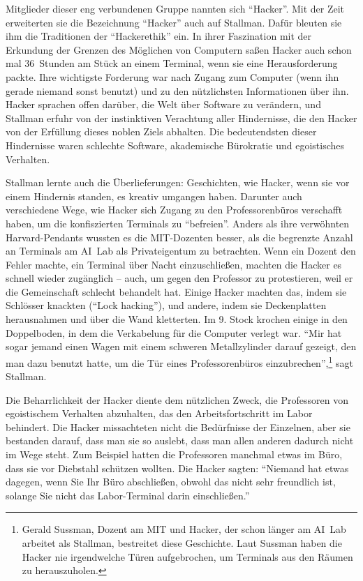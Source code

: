 Mitglieder dieser eng verbundenen Gruppe nannten sich "`Hacker"'. Mit der Zeit erweiterten sie die Bezeichnung "`Hacker"' auch auf Stallman. Dafür bleuten sie ihm die Traditionen der "`Hackerethik"' ein. In ihrer Faszination mit der Erkundung der Grenzen des Möglichen von Computern saßen Hacker auch schon mal 36~Stunden am Stück an einem Terminal, wenn sie eine Herausforderung packte. Ihre wichtigste Forderung war nach Zugang zum Computer (wenn ihn gerade niemand sonst benutzt) und zu den nützlichsten Informationen über ihn. Hacker sprachen offen darüber, die Welt über Software zu verändern, und Stallman erfuhr von der instinktiven Verachtung aller Hindernisse, die den Hacker von der Erfüllung dieses noblen Ziels abhalten. Die bedeutendsten dieser Hindernisse waren schlechte Software, akademische Bürokratie und egoistisches Verhalten.

Stallman lernte auch die Überlieferungen: Geschichten, wie Hacker, wenn sie vor einem Hindernis standen, es kreativ umgangen haben. Darunter auch verschiedene Wege, wie Hacker sich Zugang zu den Professorenbüros verschafft haben, um die konfiszierten Terminals zu "`befreien"'. Anders als ihre verwöhnten Harvard-Pendants wussten es die MIT-Dozenten besser, als die begrenzte Anzahl an Terminals am AI~Lab als Privateigentum zu betrachten. Wenn ein Dozent den Fehler machte, ein Terminal über Nacht einzuschließen, machten die Hacker es schnell wieder zugänglich – auch, um gegen den Professor zu protestieren, weil er die Gemeinschaft schlecht behandelt hat. Einige Hacker machten das, indem sie Schlösser knackten ("`Lock hacking"'), und andere, indem sie Deckenplatten herausnahmen und über die Wand kletterten. Im 9. Stock krochen einige in den Doppelboden, in dem die Verkabelung für die Computer verlegt war. "`Mir hat sogar jemand einen Wagen mit einem schweren Metallzylinder darauf gezeigt, den man dazu benutzt hatte, um die Tür eines Professorenbüros einzubrechen"',\footnote{Gerald Sussman, Dozent am MIT und Hacker, der schon länger am AI~Lab arbeitet als Stallman, bestreitet diese Geschichte. Laut Sussman haben die Hacker nie irgendwelche Türen aufgebrochen, um Terminals aus den Räumen zu herauszuholen.} sagt Stallman.

Die Beharrlichkeit der Hacker diente dem nützlichen Zweck, die Professoren von egoistischem Verhalten abzuhalten, das den Arbeitsfortschritt im Labor behindert. Die Hacker missachteten nicht die Bedürfnisse der Einzelnen, aber sie bestanden darauf, dass man sie so auslebt, dass man allen anderen dadurch nicht im Wege steht. Zum Beispiel hatten die Professoren manchmal etwas im Büro, dass sie vor Diebstahl schützen wollten. Die Hacker sagten: "`Niemand hat etwas dagegen, wenn Sie Ihr Büro abschließen, obwohl das nicht sehr freundlich ist, solange Sie nicht das Labor-Terminal darin einschließen."'

